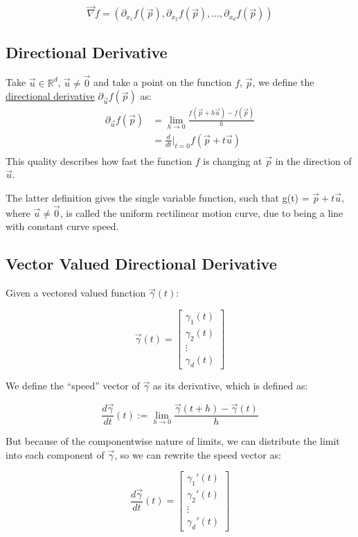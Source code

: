 \documentclass[11 pt, twoside]{article}
\begin{document}
$$\vec{\nabla}f = (\partial_{x_1} f(\vec{p}), \partial_{x_2} f(\vec{p}), \dots, \partial_{x_d}f(\vec{p}))$$

\subsection{Directional Derivative}

Take $\vec{u} \in \mathbb{R}^d$, $\vec{u} \neq \vec{0}$ and take a point on the function $f$, $\vec{p}$, we define the \underline{directional derivative}
$\partial_{\vec{u}}f(\vec{p})$ as:
\begin{align*}
\partial_{\vec{u}}f(\vec{p}) &= \lim_{h\to0} \frac{f(\vec{p} + h\vec{u}) - f(\vec{p})}{h}\\
&= \frac{d}{dt}\big|_{t=0} f(\vec{p} + t\vec{u})\\
\end{align*}
This quality describes how fast the function $f$ is changing at $\vec{p}$ in the direction of $\vec{u}$.

The latter definition gives the single variable function, such that g(t) = $\vec{p} + t\vec{u}$, where $\vec{u} \neq \vec{0}$, is called the uniform rectilinear motion curve, due to being a line with constant curve speed.

\subsection{Vector Valued Directional Derivative}
Given a vectored valued function $\vec{\gamma}(t)$:

\begin{equation*}
    \vec{\gamma}(t) = \left[
    \begin{array}{c}
        \gamma_1 (t)\\
        \gamma_2 (t)\\
        \vdots\\
        \gamma_d (t)
    \end{array} \right]
\end{equation*}

We define the ``speed'' vector of $\vec{\gamma}$ as its derivative, which is
defined as:

$$\frac{d\vec{\gamma}}{dt}(t) := \lim_{h\to0} \frac{\vec{\gamma}(t + h) - \vec{\gamma}(t)}{h}$$

But because of the componentwise nature of limits, we can distribute the limit
into each component of $\vec{\gamma}$, so we can rewrite the speed vector as:

\begin{equation*}
    \frac{d\vec{\gamma}}{dt}(t) = \left[
    \begin{array}{c}
        \gamma_1' (t)\\
        \gamma_2' (t)\\
        \vdots\\
        \gamma_d' (t)
    \end{array} \right]
\end{equation*}
\end{document}
